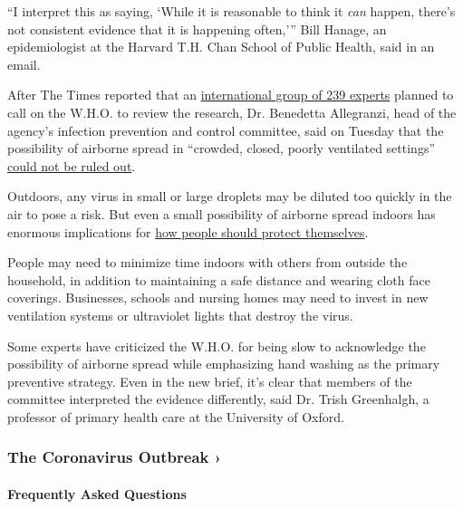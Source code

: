 ``I interpret this as saying, `While it is reasonable to think it
\emph{can} happen, there's not consistent evidence that it is happening
often,''' Bill Hanage, an epidemiologist at the Harvard T.H. Chan School
of Public Health, said in an email.

After The Times reported that an
\href{https://www.nytimes.com/2020/07/04/health/239-experts-with-one-big-claim-the-coronavirus-is-airborne.html}{international
group of 239 experts} planned to call on the W.H.O. to review the
research, Dr. Benedetta Allegranzi, head of the agency's infection
prevention and control committee, said on Tuesday that the possibility
of airborne spread in ``crowded, closed, poorly ventilated settings''
\href{https://www.nytimes.com/2020/07/07/health/coronavirus-aerosols-who.html}{could
not be ruled out}.

Outdoors, any virus in small or large droplets may be diluted too
quickly in the air to pose a risk. But even a small possibility of
airborne spread indoors has enormous implications for
\href{https://www.nytimes.com/2020/07/06/health/coronavirus-airborne-aerosols.html}{how
people should protect themselves}.

People may need to minimize time indoors with others from outside the
household, in addition to maintaining a safe distance and wearing cloth
face coverings. Businesses, schools and nursing homes may need to invest
in new ventilation systems or ultraviolet lights that destroy the virus.

Some experts have criticized the W.H.O. for being slow to acknowledge
the possibility of airborne spread while emphasizing hand washing as the
primary preventive strategy. Even in the new brief, it's clear that
members of the committee interpreted the evidence differently, said Dr.
Trish Greenhalgh, a professor of primary health care at the University
of Oxford.

\href{https://www.nytimes.com/news-event/coronavirus?action=click\&pgtype=Article\&state=default\&region=MAIN_CONTENT_3\&context=storylines_faq}{}

\hypertarget{the-coronavirus-outbreak-}{%
\subsubsection{The Coronavirus Outbreak
›}\label{the-coronavirus-outbreak-}}

\hypertarget{frequently-asked-questions}{%
\paragraph{Frequently Asked
Questions}\label{frequently-asked-questions}}

